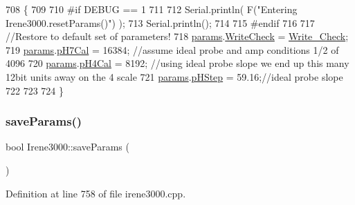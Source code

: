 \begin{DoxyCode}
708 \{
709 
710 \textcolor{preprocessor}{#if DEBUG == 1 }
711 
712     Serial.println( F(\textcolor{stringliteral}{"Entering Irene3000.resetParams()"}) );
713     Serial.println();
714 
715 \textcolor{preprocessor}{#endif }
716 
717     \textcolor{comment}{//Restore to default set of parameters!}
718     \hyperlink{class_irene3000_a136585a5ee7f9ac6ab52175fa153f8e3}{params}.\hyperlink{struct_irene3000_1_1parameters___t_a56f1f14d33a69300d580eda2dc52cecd}{WriteCheck} = \hyperlink{_irene3000_8h_a9fa3b8fd890fde289060ee254cd273d5}{Write\_Check};
719     \hyperlink{class_irene3000_a136585a5ee7f9ac6ab52175fa153f8e3}{params}.\hyperlink{struct_irene3000_1_1parameters___t_a21265466a570d84bff914f26d2f7a03e}{pH7Cal} = 16384; \textcolor{comment}{//assume ideal probe and amp conditions 1/2 of 4096}
720     \hyperlink{class_irene3000_a136585a5ee7f9ac6ab52175fa153f8e3}{params}.\hyperlink{struct_irene3000_1_1parameters___t_a1144de6fb54eb3e1dd2a3d8c2afc97dc}{pH4Cal} = 8192; \textcolor{comment}{//using ideal probe slope we end up this many 12bit units away on the
       4 scale}
721     \hyperlink{class_irene3000_a136585a5ee7f9ac6ab52175fa153f8e3}{params}.\hyperlink{struct_irene3000_1_1parameters___t_a61cfcc2539d5f630e9071f3753aba9fe}{pHStep} = 59.16;\textcolor{comment}{//ideal probe slope}
722 
723 
724 \}
\end{DoxyCode}
\mbox{\label{class_irene3000_a63dbd38e79b8cd5f1fba4b245501a894}} 
\subsubsection{\texorpdfstring{save\+Params()}{saveParams()}}
{\footnotesize\ttfamily bool Irene3000\+::save\+Params (\begin{DoxyParamCaption}{ }\end{DoxyParamCaption})}



Definition at line 758 of file irene3000.\+cpp.


